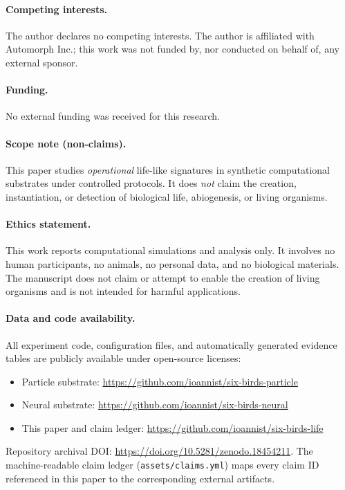 \documentclass[11pt]{article}
\begin{document}
\paragraph{Competing interests.}
The author declares no competing interests. The author is affiliated with Automorph Inc.; this work was not funded by, nor conducted on behalf of, any external sponsor.

\paragraph{Funding.}
No external funding was received for this research.

\paragraph{Scope note (non-claims).}
This paper studies \emph{operational} life-like signatures in synthetic computational substrates under controlled protocols. It does \emph{not} claim the creation, instantiation, or detection of biological life, abiogenesis, or living organisms.

\paragraph{Ethics statement.}
This work reports computational simulations and analysis only. It involves no human participants, no animals, no personal data, and no biological materials. The manuscript does not claim or attempt to enable the creation of living organisms and is not intended for harmful applications.

\paragraph{Data and code availability.}
All experiment code, configuration files, and automatically generated evidence tables are publicly available under open-source licenses:
\begin{itemize}[noitemsep,topsep=2pt]
  \item Particle substrate: \url{https://github.com/ioannist/six-birds-particle}
  \item Neural substrate: \url{https://github.com/ioannist/six-birds-neural}
  \item This paper and claim ledger: \url{https://github.com/ioannist/six-birds-life}
\end{itemize}
Repository archival DOI: \url{https://doi.org/10.5281/zenodo.18454211}.
The machine-readable claim ledger (\texttt{assets/claims.yml}) maps every claim ID referenced in this paper to the corresponding external artifacts.
\end{document}
